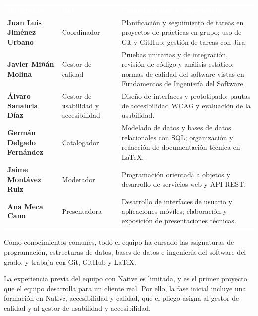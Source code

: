 \documentclass[11pt,a4paper]{article}
\newcommand{\hl}[1]{\textcolor{gblue}{\textbf{#1}}}
\begin{document}
\par\noindent\begin{tabular}{@{}>{\raggedright\arraybackslash}p{}>{\raggedright\arraybackslash}p{}>{\raggedright\arraybackslash}p{}@{}}
\rowcolor{gblue}\textcolor{white}{\textbf{Integrante}} & \textcolor{white}{\textbf{Rol}} & \textcolor{white}{\textbf{Conocimientos y experiencia}} \\
\hl{Juan Luis Jiménez Urbano} & Coordinador & Planificación y seguimiento de tareas en proyectos de prácticas en grupo; uso de Git y GitHub; gestión de tareas con Jira. \\ \arrayrulecolor{gline}\hline
\rowcolor{glight}
\hl{Javier Miñán Molina} & Gestor de calidad & Pruebas unitarias y de integración, revisión de código y análisis estático; normas de calidad del software vistas en Fundamentos de Ingeniería del Software. \\ \arrayrulecolor{gline}\hline
\hl{Álvaro Sanabria Díaz} & Gestor de usabilidad y accesibilidad & Diseño de interfaces y prototipado; pautas de accesibilidad WCAG y evaluación de la usabilidad. \\ \arrayrulecolor{gline}\hline
\rowcolor{glight}
\hl{Germán Delgado Fernández} & Catalogador & Modelado de datos y bases de datos relacionales con SQL; organización y redacción de documentación técnica en LaTeX. \\ \arrayrulecolor{gline}\hline
\hl{Jaime Montávez Ruiz} & Moderador & Programación orientada a objetos y desarrollo de servicios web y API REST. \\ \arrayrulecolor{gline}\hline
\rowcolor{glight}
\hl{Ana Meca Cano} & Presentadora & Desarrollo de interfaces de usuario y aplicaciones móviles; elaboración y exposición de presentaciones técnicas. \\ \arrayrulecolor{gline}\hline
\end{tabular}\par\medskip
Como conocimientos comunes, todo el equipo ha cursado las asignaturas de programación, estructuras de datos, bases de datos e ingeniería del software del grado, y trabaja con Git, GitHub y LaTeX.

La experiencia previa del equipo con Native es limitada, y es el primer proyecto que el equipo desarrolla para un cliente real. Por ello, la fase inicial incluye una formación en Native, accesibilidad y calidad, que el pliego asigna al gestor de calidad y al gestor de usabilidad y accesibilidad.
\end{document}
